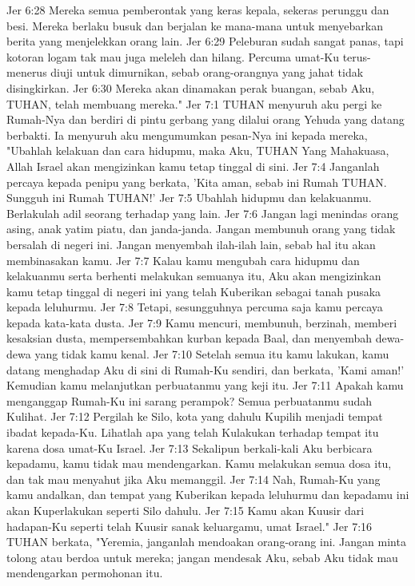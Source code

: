 Jer 6:28  Mereka semua pemberontak yang keras kepala, sekeras perunggu dan besi. Mereka berlaku busuk dan berjalan ke mana-mana untuk menyebarkan berita yang menjelekkan orang lain.
Jer 6:29  Peleburan sudah sangat panas, tapi kotoran logam tak mau juga meleleh dan hilang. Percuma umat-Ku terus-menerus diuji untuk dimurnikan, sebab orang-orangnya yang jahat tidak disingkirkan.
Jer 6:30  Mereka akan dinamakan perak buangan, sebab Aku, TUHAN, telah membuang mereka."
Jer 7:1  TUHAN menyuruh aku pergi ke Rumah-Nya dan berdiri di pintu gerbang yang dilalui orang Yehuda yang datang berbakti. Ia menyuruh aku mengumumkan pesan-Nya ini kepada mereka, "Ubahlah kelakuan dan cara hidupmu, maka Aku, TUHAN Yang Mahakuasa, Allah Israel akan mengizinkan kamu tetap tinggal di sini.
Jer 7:4  Janganlah percaya kepada penipu yang berkata, 'Kita aman, sebab ini Rumah TUHAN. Sungguh ini Rumah TUHAN!'
Jer 7:5  Ubahlah hidupmu dan kelakuanmu. Berlakulah adil seorang terhadap yang lain.
Jer 7:6  Jangan lagi menindas orang asing, anak yatim piatu, dan janda-janda. Jangan membunuh orang yang tidak bersalah di negeri ini. Jangan menyembah ilah-ilah lain, sebab hal itu akan membinasakan kamu.
Jer 7:7  Kalau kamu mengubah cara hidupmu dan kelakuanmu serta berhenti melakukan semuanya itu, Aku akan mengizinkan kamu tetap tinggal di negeri ini yang telah Kuberikan sebagai tanah pusaka kepada leluhurmu.
Jer 7:8  Tetapi, sesungguhnya percuma saja kamu percaya kepada kata-kata dusta.
Jer 7:9  Kamu mencuri, membunuh, berzinah, memberi kesaksian dusta, mempersembahkan kurban kepada Baal, dan menyembah dewa-dewa yang tidak kamu kenal.
Jer 7:10  Setelah semua itu kamu lakukan, kamu datang menghadap Aku di sini di Rumah-Ku sendiri, dan berkata, 'Kami aman!' Kemudian kamu melanjutkan perbuatanmu yang keji itu.
Jer 7:11  Apakah kamu menganggap Rumah-Ku ini sarang perampok? Semua perbuatanmu sudah Kulihat.
Jer 7:12  Pergilah ke Silo, kota yang dahulu Kupilih menjadi tempat ibadat kepada-Ku. Lihatlah apa yang telah Kulakukan terhadap tempat itu karena dosa umat-Ku Israel.
Jer 7:13  Sekalipun berkali-kali Aku berbicara kepadamu, kamu tidak mau mendengarkan. Kamu melakukan semua dosa itu, dan tak mau menyahut jika Aku memanggil.
Jer 7:14  Nah, Rumah-Ku yang kamu andalkan, dan tempat yang Kuberikan kepada leluhurmu dan kepadamu ini akan Kuperlakukan seperti Silo dahulu.
Jer 7:15  Kamu akan Kuusir dari hadapan-Ku seperti telah Kuusir sanak keluargamu, umat Israel."
Jer 7:16  TUHAN berkata, "Yeremia, janganlah mendoakan orang-orang ini. Jangan minta tolong atau berdoa untuk mereka; jangan mendesak Aku, sebab Aku tidak mau mendengarkan permohonan itu.
